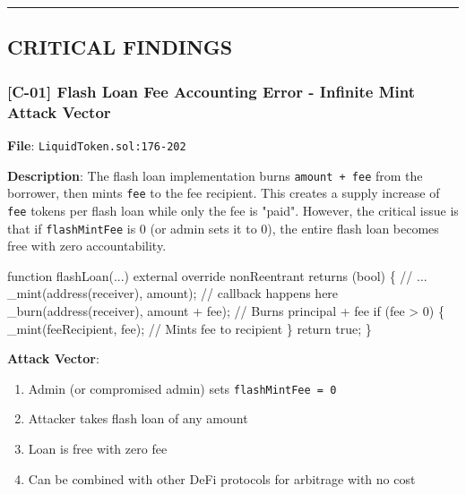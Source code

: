 \documentclass[
]{article}
\newenvironment{Shaded}{}{}
\newcommand{\NormalTok}[1]{#1}
\providecommand{\tightlist}{%
  \setlength{\itemsep}{0pt}\setlength{\parskip}{0pt}}
\begin{document}
\begin{center}\rule{0.5\linewidth}{0.5pt}\end{center}

\subsection{CRITICAL FINDINGS}\label{critical-findings}

\subsubsection{{[}C-01{]} Flash Loan Fee Accounting Error - Infinite
Mint Attack
Vector}\label{c-01-flash-loan-fee-accounting-error---infinite-mint-attack-vector}

\textbf{File}: \texttt{LiquidToken.sol:176-202}

\textbf{Description}: The flash loan implementation burns
\texttt{amount\ +\ fee} from the borrower, then mints \texttt{fee} to
the fee recipient. This creates a supply increase of \texttt{fee} tokens
per flash loan while only the fee is "paid". However, the critical issue
is that if \texttt{flashMintFee} is 0 (or admin sets it to 0), the
entire flash loan becomes free with zero accountability.

\begin{Shaded}
\begin{Highlighting}[]
\NormalTok{function flashLoan(...) external override nonReentrant returns (bool) \{}
\NormalTok{    // ...}
\NormalTok{    \_mint(address(receiver), amount);}
\NormalTok{    // callback happens here}
\NormalTok{    \_burn(address(receiver), amount + fee);  // Burns principal + fee}
\NormalTok{    if (fee \textgreater{} 0) \{}
\NormalTok{        \_mint(feeRecipient, fee);  // Mints fee to recipient}
\NormalTok{    \}}
\NormalTok{    return true;}
\NormalTok{\}}
\end{Highlighting}
\end{Shaded}

\textbf{Attack Vector}:

\begin{enumerate}
\def\labelenumi{\arabic{enumi}.}
\tightlist
\item
  Admin (or compromised admin) sets \texttt{flashMintFee\ =\ 0}
\item
  Attacker takes flash loan of any amount
\item
  Loan is free with zero fee
\item
  Can be combined with other DeFi protocols for arbitrage with no cost
\end{enumerate}
\end{document}
